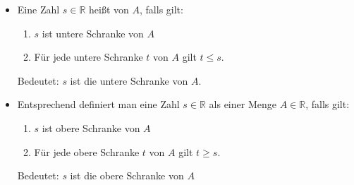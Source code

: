 

\begin{itemize}

    \item Eine Zahl $s \in \mathbb{R}$ heißt  von $A$, falls gilt:

        \begin{enumerate}
            \item $s$ ist untere Schranke von $A$
            \item Für jede untere Schranke $t$ von $A$ gilt $t \leq s$.
        \end{enumerate}

        Bedeutet: $s$ ist die  untere Schranke von $A$.
        
    \item Entsprechend definiert man eine Zahl $s \in \mathbb{R}$ als  einer Menge $A \in \mathbb{R}$, falls gilt:

        \begin{enumerate}
            \item $s$ ist obere Schranke von $A$
            \item Für jede obere Schranke $t$ von $A$ gilt $t \geq s$.
        \end{enumerate}

        Bedeutet: $s$ ist die  obere Schranke von $A$

\end{itemize}



